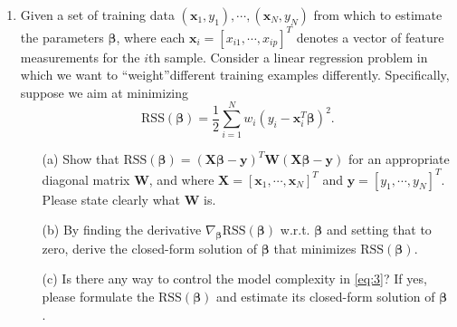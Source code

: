 \documentclass[10pt]{article}
\begin{document}
\begin{enumerate}[1.]
	\item {} Given a set of training data $(\mathbf{x}_{1},y_1),\cdots,(\mathbf{x}_{N},y_N)$ from which to estimate the parameters $\bm{\beta}$,
	      where each $\mathbf{x}_{i} = \left[x_{i1},\cdots,x_{ip} \right]^{T}$ denotes a vector of feature measurements for the $i$th sample.
	      Consider a linear regression problem in which we want to \textquotedblleft weight\textquotedblright different training examples differently.
	      Specifically, suppose we aim at minimizing
	      \begin{equation}
		      \textrm{RSS}(\bm{\beta}) = \frac{1}{2}\sum_{i=1}^{N}w_{i}(y_{i} -\mathbf{x}_{i}^{T}\bm{\beta})^{2}.
		      \label{eq:3}
	      \end{equation}
	      \begin{itemize}
		      \item[(a)] Show that $\textrm{RSS}(\bm{\beta}) = (\mathbf{X}\bm{\beta} - \mathbf{y})^{T}\mathbf{W}(\mathbf{X}\bm{\beta}-\mathbf{y})$
		            for an appropriate diagonal matrix $\mathbf{W}$, and where $\mathbf{X} = \left[\mathbf{x}_{1},\cdots,\mathbf{x}_{N} \right]^{T}$ and $\mathbf{y} = \left[y_1,\cdots,y_N \right]^{T}$.
		            Please state clearly what $\mathbf{W}$ is. ~

		      \item[(b)] By finding the derivative $\nabla_{\bm{\beta}}\textrm{RSS}(\bm{\beta})$ w.r.t. $\bm\beta$ and setting that to zero,
		            derive the closed-form solution of $\bm{\beta}$ that minimizes $\textrm{RSS}(\bm{\beta})$.~

		      \item[(c)] Is there any way to control the model complexity in \eqref{eq:3}? If yes,
		            please formulate the $\textrm{RSS}(\bm\beta)$ and estimate its closed-form solution of $\bm\beta$.~

	      \end{itemize}


\end{enumerate}
\end{document}
